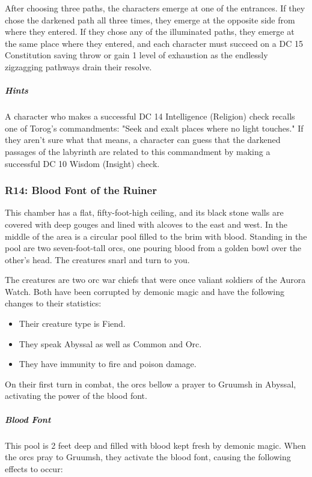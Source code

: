 \documentclass[10pt,a4paper,twoside,bg=print,twocolumn,openany,nodeprecatedcode]{dndbook}
\begin{document}
After choosing three paths, the characters emerge at one of the entrances. If they chose the darkened path all three times, they emerge at the opposite side from where they entered. If they chose any of the illuminated paths, they emerge at the same place where they entered, and each character must succeed on a DC 15 Constitution saving throw or gain 1 level of exhaustion as the endlessly zigzagging pathways drain their resolve.

\subparagraph{Hints}
A character who makes a successful DC 14 Intelligence (Religion) check recalls one of Torog's commandments: "Seek and exalt places where no light touches." If they aren't sure what that means, a character can guess that the darkened passages of the labyrinth are related to this commandment by making a successful DC 10 Wisdom (Insight) check.

\subsubsection{R14: Blood Font of the Ruiner}
\begin{DndReadAloud}{}
This chamber has a flat, fifty-foot-high ceiling, and its black stone walls are covered with deep gouges and lined with alcoves to the east and west. In the middle of the area is a circular pool filled to the brim with blood. Standing in the pool are two seven-foot-tall orcs, one pouring blood from a golden bowl over the other's head. The creatures snarl and turn to you.

\end{DndReadAloud}

The creatures are two orc war chiefs that were once valiant soldiers of the Aurora Watch. Both have been corrupted by demonic magic and have the following changes to their statistics:


\begin{itemize}
\item Their creature type is Fiend.
\item They speak Abyssal as well as Common and Orc.
\item They have immunity to fire and poison damage.
\end{itemize}

On their first turn in combat, the orcs bellow a prayer to Gruumsh in Abyssal, activating the power of the blood font.

\subparagraph{Blood Font}
This pool is 2 feet deep and filled with blood kept fresh by demonic magic. When the orcs pray to Gruumsh, they activate the blood font, causing the following effects to occur:
\end{document}

